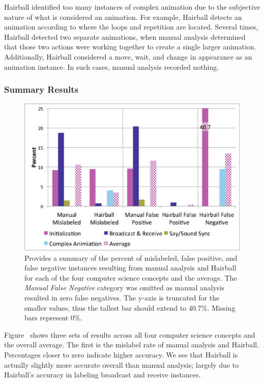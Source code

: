 Hairball identified too many instances of complex animation due to the
subjective nature of what is considered an animation.  For example, Hairball
detects an animation according to where the loops and repetition are
located. Several times, Hairball detected two separate animations, when manual
analysis determined that those two actions were working together to create a
single larger animation. Additionally, Hairball considered a move, wait, and
change in appearance as an \incom{} animation instance. In such cases, manual
analysis recorded nothing.

\subsubsection{Summary Results}
\begin{figure}[!t]
\centering \includegraphics[trim=.3in .15in .2in .15in, clip,
  width=5.25in]{graphs/AutoSummary.eps}
\caption{Provides a summary of the percent of mislabeled, false positive, and
  false negative instances resulting from manual analysis and Hairball for each
  of the four computer science concepts and the average. The \emph{Manual False
    Negative} category was omitted as manual analysis resulted in zero false
  negatives. The y-axis is truncated for the smaller values, thus the tallest
  bar should extend to 40.7\%. Missing bars represent 0\%.}
\end{figure}

Figure~ shows three sets of results across all four
computer science concepts and the overall average. The first is the mislabel
rate of manual analysis and Hairball. Percentages closer to zero indicate
higher accuracy. We see that Hairball is actually slightly more accurate
overall than manual analysis; largely due to Hairball's accuracy in labeling
broadcast and receive instances.

